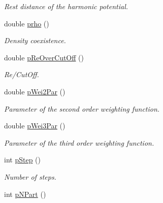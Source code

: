 \begin{DoxyCompactItemize}
\begin{DoxyCompactList}\small\item\em \-Rest distance of the harmonic potential. \end{DoxyCompactList}\item 
\hypertarget{classVarData_a9b47d9a32db9326bceac9402c94683d9}{double \hyperlink{classVarData_a9b47d9a32db9326bceac9402c94683d9}{prho} ()}\label{classVarData_a9b47d9a32db9326bceac9402c94683d9}

\begin{DoxyCompactList}\small\item\em \-Density coexistence. \end{DoxyCompactList}\item 
\hypertarget{classVarData_a71e85d43bc5bd1fcb6563c91a67576b2}{double \hyperlink{classVarData_a71e85d43bc5bd1fcb6563c91a67576b2}{p\-Re\-Over\-Cut\-Off} ()}\label{classVarData_a71e85d43bc5bd1fcb6563c91a67576b2}

\begin{DoxyCompactList}\small\item\em \-Re/\-Cut\-Off. \end{DoxyCompactList}\item 
\hypertarget{classVarData_a217f00c8faf9ba6bb022913df51e5f24}{double \hyperlink{classVarData_a217f00c8faf9ba6bb022913df51e5f24}{p\-Wei2\-Par} ()}\label{classVarData_a217f00c8faf9ba6bb022913df51e5f24}

\begin{DoxyCompactList}\small\item\em \-Parameter of the second order weighting function. \end{DoxyCompactList}\item 
\hypertarget{classVarData_aa5c40af319c1dda726271b9fe4059443}{double \hyperlink{classVarData_aa5c40af319c1dda726271b9fe4059443}{p\-Wei3\-Par} ()}\label{classVarData_aa5c40af319c1dda726271b9fe4059443}

\begin{DoxyCompactList}\small\item\em \-Parameter of the third order weighting function. \end{DoxyCompactList}\item 
\hypertarget{classVarData_acf2e386d659b56caeceb504cd74e90e0}{int \hyperlink{classVarData_acf2e386d659b56caeceb504cd74e90e0}{p\-Step} ()}\label{classVarData_acf2e386d659b56caeceb504cd74e90e0}

\begin{DoxyCompactList}\small\item\em \-Number of steps. \end{DoxyCompactList}\item 
\hypertarget{classVarData_a388622b5e7d2ad20e8ac1a8a951d655f}{int \hyperlink{classVarData_a388622b5e7d2ad20e8ac1a8a951d655f}{p\-N\-Part} ()}\label{classVarData_a388622b5e7d2ad20e8ac1a8a951d655f}


\end{DoxyCompactItemize}

